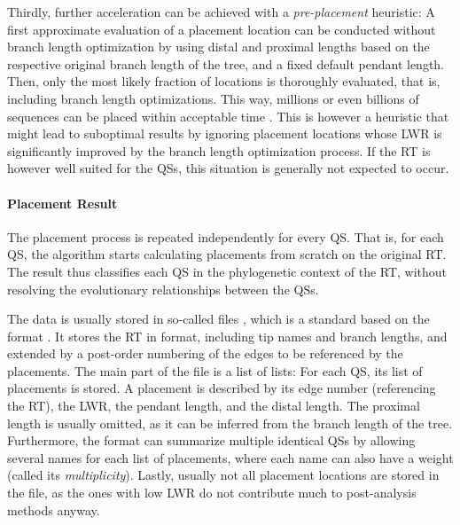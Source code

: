 Thirdly, further acceleration can be achieved with a \emph{pre-placement} heuristic:
A first approximate evaluation of a placement location can be conducted without branch length optimization by using
distal and proximal lengths based on the respective original branch length of the tree, and a fixed default pendant length.
Then, only the most likely fraction of locations is thoroughly evaluated, that is, including branch length optimizations.
This way, millions or even billions of sequences can be placed within acceptable time \cite{Barbera2018}.
This is however a heuristic that might lead to suboptimal results by ignoring placement locations
whose \ac{LWR} is significantly improved by the branch length optimization process.
If the \ac{RT} is however well suited for the \acp{QS}, this situation is generally not expected to occur.

\paragraph{Placement Result}
\label{ch:Foundations:sec:PhylogeneticPlacement:sub:PipelineAndComputation:par:PlacementResults}

The placement process is repeated independently for every \ac{QS}.
That is, for each \ac{QS}, the algorithm starts calculating placements from scratch on the original \ac{RT}.
The result thus classifies each \ac{QS} in the phylogenetic context of the \ac{RT},
without resolving the evolutionary relationships between the \acp{QS}.

The data is usually stored in so-called  files \cite{Matsen2012},
which is a standard based on the  format \cite{JsonMemo,JsonStandard}.
It stores the \ac{RT} in  format, including tip names and branch lengths,
and extended by a post-order numbering of the edges to be referenced by the placements.
The main part of the file is a list of lists:
For each \ac{QS}, its list of placements is stored.
A placement is described by its edge number (referencing the \ac{RT}),
the \ac{LWR}, the pendant length, and the distal length.
The proximal length is usually omitted, as it can be inferred from the branch length of the tree.
Furthermore, the format can summarize multiple identical \acp{QS}
by allowing several names for each list of placements,
where each name can also have a weight (called its \emph{multiplicity}).
Lastly, usually not all placement locations are stored in the file,
as the ones with low \ac{LWR} do not contribute much to post-analysis methods anyway.

